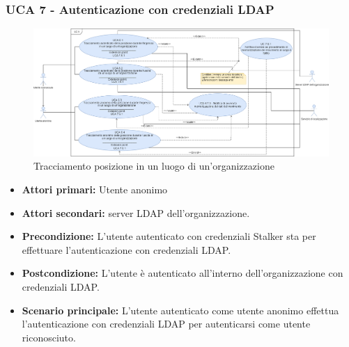 \subsubsection{UCA 7 - Autenticazione con credenziali LDAP}%

\begin{figure}[h]
	\centering
	\includegraphics[scale=0.3]{sezioni/UseCase/Immagini/UCA6.png}
	\caption{Tracciamento posizione in un luogo di un'organizzazione}
\end{figure}

\begin{itemize}
	\item \textbf{Attori primari:} Utente anonimo 
	\item \textbf{Attori secondari:} server LDAP dell'organizzazione.
	\item \textbf{Precondizione:} L'utente autenticato con credenziali Stalker sta per effettuare l'autenticazione con credenziali LDAP.
	\item \textbf{Postcondizione:} L'utente è autenticato all'interno dell'organizzazione con credenziali LDAP.
	\item \textbf{Scenario principale:} L'utente autenticato come utente anonimo effettua l'autenticazione con credenziali LDAP per autenticarsi come utente riconosciuto.
\end{itemize}

